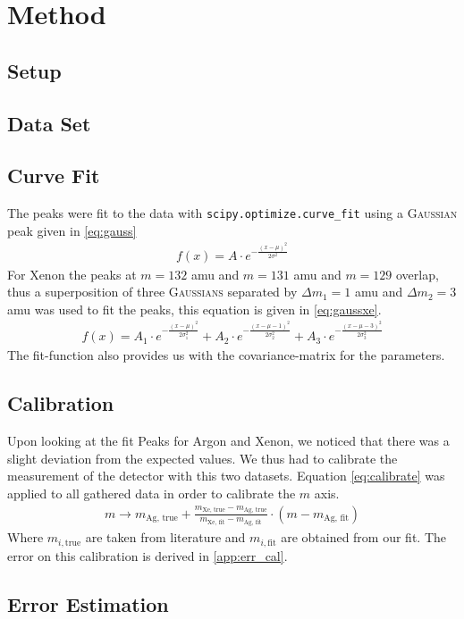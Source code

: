 \newpage
\section{Method} \label{sec:method}
\subsection{Setup}
\subsection{Data Set}
\subsection{Curve Fit}
The peaks were fit to the data with \texttt{scipy.optimize.curve\_fit}\cite{scipy} using a {\scshape Gaussian} peak given in \eqref{eq:gauss}
\begin{align}
    f(x) = A\cdot e^{-\frac{(x-\mu)^2}{2\sigma^2}} \label{eq:gauss}
\end{align}
For Xenon the peaks at $m=132$ amu and $m=131$ amu and $m=129$ overlap, thus a superposition of three {\scshape Gaussians} separated by $\Delta m_1 = 1$ amu and $\Delta m_2 = 3$ amu was used to fit the peaks, this equation is given in \eqref{eq:gaussxe}.
\begin{align}
    f(x) = A_1\cdot e^{-\frac{(x-\mu)^2}{2\sigma_1^2}} + A_2\cdot e^{-\frac{(x-\mu - 1)^2}{2\sigma_2^2}} + A_3\cdot e^{-\frac{(x-\mu-3)^2}{2\sigma_3^2}} \label{eq:gaussxe}
\end{align}
The fit-function also provides us with the covariance-matrix for the parameters.

\subsection{Calibration}
Upon looking at the fit Peaks for Argon and Xenon, we noticed that there was a slight deviation from the expected values. We thus had to calibrate the measurement of the detector with this two datasets. Equation \eqref{eq:calibrate} was applied to all gathered data in order to calibrate the $m$ axis.
\begin{align}
    m \to m_\text{Ag, true} + \frac{m_\text{Xe, true} - m_\text{Ag, true}}{m_\text{Xe, fit} - m_\text{Ag, fit}} \cdot (m - m_\text{Ag, fit}) \label{eq:calibrate}
\end{align}
Where $m_{i, \text{true}}$ are taken from literature and $m_{i, \text{fit}}$ are obtained from our fit.
The error on this calibration is derived in \ref{app:err_cal}.
\subsection{Error Estimation}


